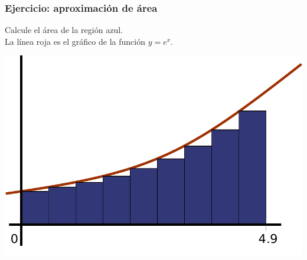 \documentclass[12pt]{beamer}
\begin{document}
  \begin{frame}
    \label{ejercicio-integral}
    \frametitle{Ejercicio: aproximación de área}
    Calcule el área de la región azul. \\
    La línea roja es el gráfico
    de la función \(y = e^x\).

    \begin{center}
      \includegraphics[scale=0.5]{integral}
    \end{center}
  \end{frame}
\end{document}
